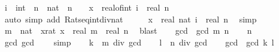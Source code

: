 \begin{isabellebody}
\ i\ {\isacharcolon}{\kern0pt}{\isacharcolon}{\kern0pt}\ int\ \ n\ {\isacharcolon}{\kern0pt}{\isacharcolon}{\kern0pt}\ nat\ \ {\isachardoublequoteopen}n\ {\isasymnoteq}\ {}{\isachardoublequoteclose}\ \ {\isachardoublequoteopen}x\ {\isacharequal}{\kern0pt}\ real{\isacharunderscore}{\kern0pt}of{\isacharunderscore}{\kern0pt}int\ i\ {\isacharslash}{\kern0pt}\ real\ n{\isachardoublequoteclose}\isanewline
\ \ \ \ \isamarkupfalse%
\ {\isacharparenleft}{\kern0pt}auto\ simp\ add{\isacharcolon}{\kern0pt}\ Rats{\isacharunderscore}{\kern0pt}eq{\isacharunderscore}{\kern0pt}int{\isacharunderscore}{\kern0pt}div{\isacharunderscore}{\kern0pt}nat{\isacharparenright}{\kern0pt}\isanewline
\ \ \isamarkupfalse%
\ \isamarkupfalse%
\ {\isachardoublequoteopen}{\isasymbar}x{\isasymbar}\ {\isacharequal}{\kern0pt}\ real\ {\isacharparenleft}{\kern0pt}nat\ {\isasymbar}i{\isasymbar}{\isacharparenright}{\kern0pt}\ {\isacharslash}{\kern0pt}\ real\ n{\isachardoublequoteclose}\ \isamarkupfalse%
\ simp\isanewline
\ \ \isamarkupfalse%
\ \isamarkupfalse%
\ m\ {\isacharcolon}{\kern0pt}{\isacharcolon}{\kern0pt}\ nat\ \ x{\isacharunderscore}{\kern0pt}rat{\isacharcolon}{\kern0pt}\ {\isachardoublequoteopen}{\isasymbar}x{\isasymbar}\ {\isacharequal}{\kern0pt}\ real\ m\ {\isacharslash}{\kern0pt}\ real\ n{\isachardoublequoteclose}\ \isamarkupfalse%
\ blast\isanewline
\ \ \isamarkupfalse%
\ {\isacharquery}{\kern0pt}gcd\ {\isacharequal}{\kern0pt}\ {\isachardoublequoteopen}gcd\ m\ n{\isachardoublequoteclose}\isanewline
\ \ \isamarkupfalse%
\ {\isacartoucheopen}n\ {\isasymnoteq}\ {}{\isacartoucheclose}\ \isamarkupfalse%
\ gcd{\isacharcolon}{\kern0pt}\ {\isachardoublequoteopen}{\isacharquery}{\kern0pt}gcd\ {\isasymnoteq}\ {}{\isachardoublequoteclose}\ \isamarkupfalse%
\ simp\isanewline
\ \ \isamarkupfalse%
\ {\isacharquery}{\kern0pt}k\ {\isacharequal}{\kern0pt}\ {\isachardoublequoteopen}m\ div\ {\isacharquery}{\kern0pt}gcd{\isachardoublequoteclose}\isanewline
\ \ \isamarkupfalse%
\ {\isacharquery}{\kern0pt}l\ {\isacharequal}{\kern0pt}\ {\isachardoublequoteopen}n\ div\ {\isacharquery}{\kern0pt}gcd{\isachardoublequoteclose}\isanewline
\ \ \isamarkupfalse%
\ {\isacharquery}{\kern0pt}gcd{\isacharprime}{\kern0pt}\ {\isacharequal}{\kern0pt}\ {\isachardoublequoteopen}gcd\ {\isacharquery}{\kern0pt}k\ {\isacharquery}{\kern0pt}l{\isachardoublequoteclose}\isanewline

\end{isabellebody}
